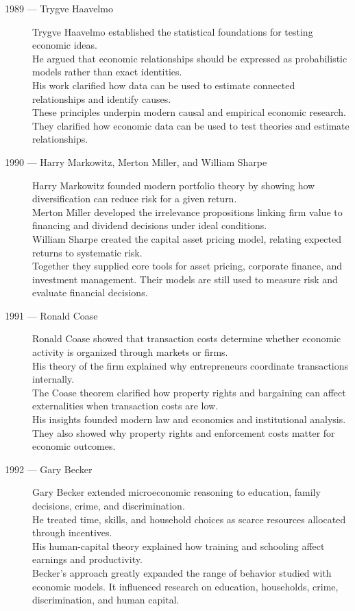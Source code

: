 \documentclass[12pt]{report}
\begin{document}
{\begin{description}
\item[1989 --- Trygve Haavelmo]
Trygve Haavelmo established the statistical foundations for testing economic ideas.\\
He argued that economic relationships should be expressed as probabilistic models rather than exact identities.\\
His work clarified how data can be used to estimate connected relationships and identify causes.\\
These principles underpin modern causal and empirical economic research. They clarified how economic data can be used to test theories and estimate relationships.

\item[1990 --- Harry Markowitz, Merton Miller, and William Sharpe]
Harry Markowitz founded modern portfolio theory by showing how diversification can reduce risk for a given return.\\
Merton Miller developed the irrelevance propositions linking firm value to financing and dividend decisions under ideal conditions.\\
William Sharpe created the capital asset pricing model, relating expected returns to systematic risk.\\
Together they supplied core tools for asset pricing, corporate finance, and investment management. Their models are still used to measure risk and evaluate financial decisions.

\item[1991 --- Ronald Coase]
Ronald Coase showed that transaction costs determine whether economic activity is organized through markets or firms.\\
His theory of the firm explained why entrepreneurs coordinate transactions internally.\\
The Coase theorem clarified how property rights and bargaining can affect externalities when transaction costs are low.\\
His insights founded modern law and economics and institutional analysis. They also showed why property rights and enforcement costs matter for economic outcomes.

\item[1992 --- Gary Becker]
Gary Becker extended microeconomic reasoning to education, family decisions, crime, and discrimination.\\
He treated time, skills, and household choices as scarce resources allocated through incentives.\\
His human-capital theory explained how training and schooling affect earnings and productivity.\\
Becker's approach greatly expanded the range of behavior studied with economic models. It influenced research on education, households, crime, discrimination, and human capital.


\end{description}}
\end{document}
